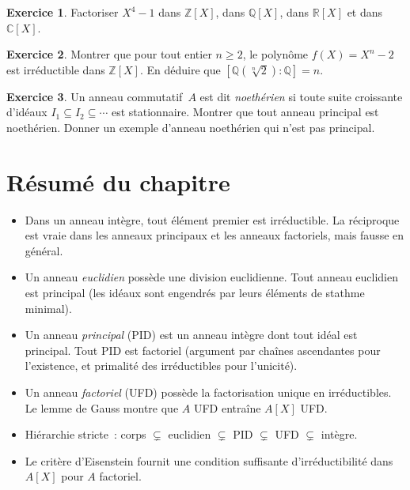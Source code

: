 \documentclass[12pt,a4paper,openany]{book}
\theoremstyle{definition}
\newtheorem{exercice}{Exercice}[chapter]
\newcommand{\Z}{\mathbb{Z}}
\newcommand{\Q}{\mathbb{Q}}
\newcommand{\R}{\mathbb{R}}
\newcommand{\C}{\mathbb{C}}
\begin{document}
\begin{exercice}\label{exo:fact-11}
Factoriser $X^4 - 1$ dans $\Z[X]$, dans $\Q[X]$, dans $\R[X]$ et dans
$\C[X]$.
\end{exercice}

\begin{exercice}\label{exo:fact-12}
Montrer que pour tout entier $n \geqslant 2$, le polynôme
$f(X) = X^n - 2$ est irréductible dans $\Z[X]$. En déduire que
$[\Q(\sqrt[n]{2}) : \Q] = n$.
\end{exercice}

\begin{exercice}\label{exo:fact-13}
Un anneau commutatif~$A$ est dit \emph{noethérien}
si toute suite croissante d'idéaux $I_1 \subseteq I_2 \subseteq \cdots$
est stationnaire. Montrer que tout anneau principal est noethérien.
Donner un exemple d'anneau noethérien qui n'est pas principal.
\end{exercice}

\section*{Résumé du chapitre~\thechapter}

\begin{itemize}
  \item Dans un anneau intègre, tout élément premier est irréductible.
        La réciproque est vraie dans les anneaux principaux et les
        anneaux factoriels, mais fausse en général.
  \item Un anneau \emph{euclidien} possède une division euclidienne.
        Tout anneau euclidien est principal (les idéaux sont engendrés
        par leurs éléments de stathme minimal).
  \item Un anneau \emph{principal} (PID) est un anneau intègre dont tout
        idéal est principal. Tout PID est factoriel (argument par chaînes
        ascendantes pour l'existence, et primalité des irréductibles
        pour l'unicité).
  \item Un anneau \emph{factoriel} (UFD) possède la factorisation unique
        en irréductibles. Le lemme de Gauss montre que $A$ UFD entraîne
        $A[X]$ UFD.
  \item Hiérarchie stricte~: corps $\subsetneq$ euclidien $\subsetneq$
        PID $\subsetneq$ UFD $\subsetneq$ intègre.
  \item Le critère d'Eisenstein fournit une condition suffisante
        d'irréductibilité dans $A[X]$ pour $A$ factoriel.
\end{itemize}
\end{document}
